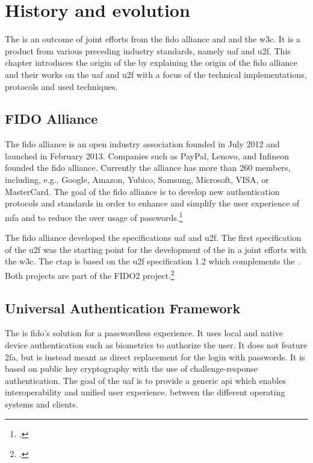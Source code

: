 
\section{History and evolution}

The \wa{} is an outcome of joint efforts from the \gls{fido} alliance and and the \gls{w3c}. It is a product from various preceding industry standards, namely \gls{uaf} and \gls{u2f}. This chapter introduces the origin of the \wa{} by explaining the origin of the \gls{fido} alliance and their works on the \gls{uaf} and \gls{u2f} with a focus of the technical implementations, protocols and used techniques.

\subsection{FIDO Alliance}

The \gls{fido} alliance is an open industry association founded in July 2012 and launched in February 2013. Companies such as PayPal, Lenovo, and Infineon founded the \gls{fido} alliance. Currently the alliance has more than 260 members, including, e.g., Google, Amazon, Yubico, Samsung, Microsoft, VISA, or MasterCard. The goal of the \gls{fido} alliance is to develop new authentication protocols and standards in order to enhance and simplify the user experience of \gls{mfa} and to reduce the over usage of passwords.\footcites[See][583]{eckert-it-sec-9}

The \gls{fido} alliance developed the specifications \gls{uaf} and \gls{u2f}. The first specification of the \gls{u2f} was the starting point for the development of the \wa{} in a joint efforts with the \gls{w3c}. The \gls{ctap} is based on the \gls{u2f} specification 1.2 which complements the \wa. Both projects are part of the FIDO2 project.\footcite[See][169--170]{grimes2017hacking}

\subsection{Universal Authentication Framework}

The  is \gls{fido}'s solution for a passwordless experience. It uses local and native device authentication such as biometrics to authorize the user. It does not feature \gls{2fa}, but is instead meant as direct replacement for the login with passwords. It is based on public key cryptography with the use of challenge-response authentication. The goal of the \gls{uaf} is to provide a generic \gls{api} which enables interoperability and unified user experience. between the different operating systems and clients.


